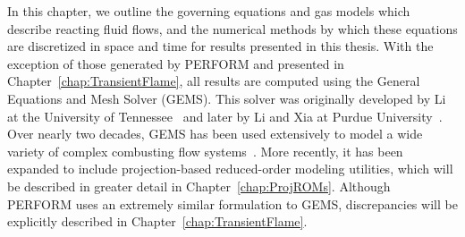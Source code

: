 
In this chapter, we outline the governing equations and gas models which describe reacting fluid flows, and the numerical methods by which these equations are discretized in space and time for results presented in this thesis. With the exception of those generated by PERFORM and presented in Chapter~\ref{chap:TransientFlame}, all results are computed using the General Equations and Mesh Solver (GEMS). This solver was originally developed by Li at the University of Tennessee~\cite{Li2001} and later by Li and Xia at Purdue University~\cite{Li2006}. Over nearly two decades, GEMS has been used extensively to model a wide variety of complex combusting flow systems~\cite{Xia2011,Huang2014,Comer2016}. More recently, it has been expanded to include projection-based reduced-order modeling utilities, which will be described in greater detail in Chapter~\ref{chap:ProjROMs}. Although PERFORM uses an extremely similar formulation to GEMS, discrepancies will be explicitly described in Chapter~\ref{chap:TransientFlame}.